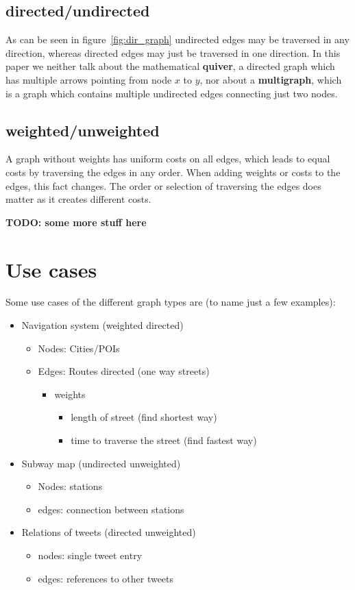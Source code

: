 \subsection{directed/undirected}

As can be seen in figure~\ref{fig:dir_graph} undirected edges may be traversed in any direction, whereas directed edges may just be traversed in one direction. In this paper we neither talk about the mathematical \textbf{quiver}, a directed graph which has multiple arrows pointing from node $x$ to $y$, nor about a \textbf{multigraph}, which is a graph which contains multiple undirected edges connecting just two nodes.


\subsection{weighted/unweighted}

A graph without weights has uniform costs on all edges, which leads to equal costs by traversing the edges in any order. When adding weights or costs to the edges, this fact changes. The order or selection of traversing the edges does matter as it creates different costs.


\textbf{TODO: some more stuff here}

\section{Use cases}
Some use cases of the different graph types are (to name just a few examples):
\begin{itemize}
\item Navigation system (weighted directed)
	\begin{itemize}
		\item Nodes: Cities/POIs
		\item Edges: Routes directed (one way streets)
		\begin{itemize}
			\item weights
			\begin{itemize}
				\item length of street (find shortest way)
				\item time to traverse the street (find fastest way)
			\end{itemize}		
		\end{itemize}
	\end{itemize}		
\item Subway map (undirected unweighted)
\begin{itemize}
	\item Nodes: stations
	\item edges: connection between stations
\end{itemize}
\item Relations of tweets (directed unweighted)
\begin{itemize}
	\item nodes: single tweet entry
	\item edges: references to other tweets
\end{itemize}
\end{itemize}




